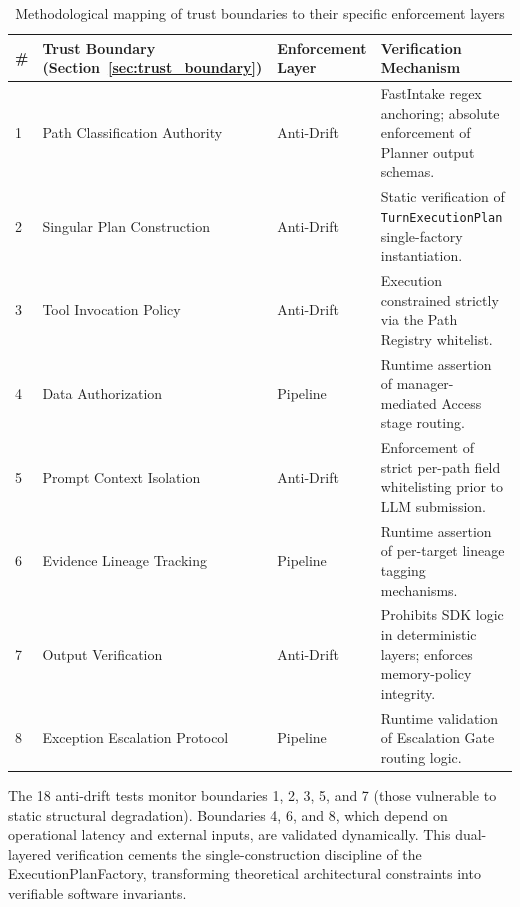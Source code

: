 \begin{table}[H]
\centering
\scriptsize
\renewcommand{\arraystretch}{1.3}
\begin{tabularx}{\textwidth}{|p{0.5cm}|p{4cm}|p{2cm}|>{\RaggedRight\arraybackslash}X|}
\hline
\rowcolor{lightgray}
\textbf{\#} & \textbf{Trust Boundary (Section~\ref{sec:trust_boundary})} & \textbf{Enforcement Layer} & \textbf{Verification Mechanism} \\ \hline
1 & Path Classification Authority & Anti-Drift & FastIntake regex anchoring; absolute enforcement of Planner output schemas. \\ \hline
2 & Singular Plan Construction & Anti-Drift & Static verification of \texttt{TurnExecutionPlan} single-factory instantiation. \\ \hline
3 & Tool Invocation Policy & Anti-Drift & Execution constrained strictly via the Path Registry whitelist. \\ \hline
4 & Data Authorization & Pipeline & Runtime assertion of manager-mediated Access stage routing. \\ \hline
5 & Prompt Context Isolation & Anti-Drift & Enforcement of strict per-path field whitelisting prior to LLM submission. \\ \hline
6 & Evidence Lineage Tracking & Pipeline & Runtime assertion of per-target lineage tagging mechanisms. \\ \hline
7 & Output Verification & Anti-Drift & Prohibits SDK logic in deterministic layers; enforces memory-policy integrity. \\ \hline
8 & Exception Escalation Protocol & Pipeline & Runtime validation of Escalation Gate routing logic. \\ \hline
\end{tabularx}
\caption{Methodological mapping of trust boundaries to their specific enforcement layers}
\label{tab:anti_drift_mapping}
\end{table}

The 18 anti-drift tests monitor boundaries 1, 2, 3, 5, and 7 (those vulnerable to static structural degradation). Boundaries 4, 6, and 8, which depend on operational latency and external inputs, are validated dynamically. This dual-layered verification cements the single-construction discipline of the ExecutionPlanFactory, transforming theoretical architectural constraints into verifiable software invariants.

